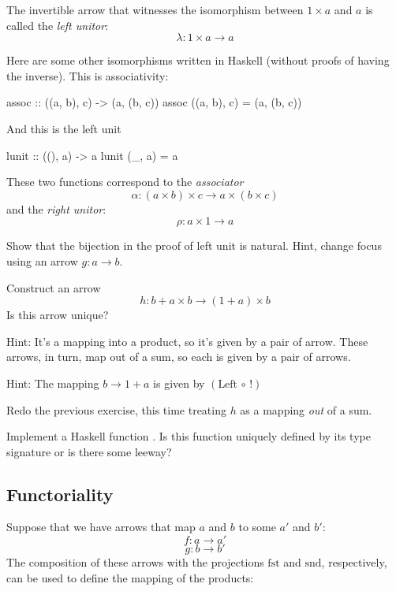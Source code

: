 \documentclass[DaoFP]{subfiles}
\begin{document}
The invertible arrow that witnesses the isomorphism between $1 \times a$ and $a$ is called the \emph{left unitor}:
\[ \lambda \colon 1 \times a \to a \]

Here are some other isomorphisms written in Haskell (without proofs of having the inverse). This is associativity:
\begin{haskell}
assoc :: ((a, b), c) -> (a, (b, c))
assoc ((a, b), c) = (a, (b, c))
\end{haskell}
And this is the left unit
\begin{haskell}
lunit :: ((), a) -> a
lunit (_, a) = a
\end{haskell}

These two functions correspond to the \emph{associator}
\[ \alpha \colon (a \times b) \times c \to a \times (b \times c) \]
and the \emph{right unitor}:
\[ \rho \colon a \times 1 \to a \]

\begin{exercise}
Show that the bijection in the proof of left unit is natural. Hint, change focus using an arrow $g \colon a \to b$.
\end{exercise}

\begin{exercise}
Construct an arrow 
\[ h \colon b + a \times b \to (1 + a) \times b \]
Is this arrow unique?

Hint: It's a mapping into a product, so it's given by a pair of arrow. These arrows, in turn, map out of a sum, so each is given by a pair of arrows. 

Hint: The mapping $b \to 1 + a$ is given by $(\text{Left} \, \circ \, !)$
\end{exercise}

\begin{exercise}
Redo the previous exercise, this time treating $h$ as a mapping \emph{out} of a sum. 
\end{exercise}

\begin{exercise}
Implement a Haskell function . Is this function uniquely defined by its type signature or is there some leeway?
\end{exercise}

\subsection{Functoriality}

Suppose that we have arrows that map $a$ and $b$ to some $a'$ and $b'$:
\[f \colon a \to a' \]
\[g \colon b \to b'\]
The composition of these arrows with the projections $\text{fst}$ and $\text{snd}$, respectively, can be used to define the mapping of the products:
\end{document}
